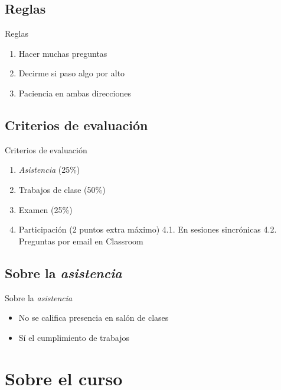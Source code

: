 \documentclass[
  11pt,
  ignorenonframetext,
]{beamer}
\providecommand{\tightlist}{%
  \setlength{\itemsep}{0pt}\setlength{\parskip}{0pt}}
\begin{document}
\hypertarget{reglas}{%
\subsection{Reglas}\label{reglas}}

\begin{frame}{Reglas}
\begin{enumerate}
\item
  Hacer muchas preguntas
\item
  Decirme si paso algo por alto
\item
  Paciencia en ambas direcciones
\end{enumerate}
\end{frame}

\hypertarget{criterios-de-evaluaciuxf3n}{%
\subsection{Criterios de evaluación}\label{criterios-de-evaluaciuxf3n}}

\begin{frame}{Criterios de evaluación}
\begin{enumerate}
\tightlist
\item
  \emph{Asistencia} (25\%)
\item
  Trabajos de clase (50\%)
\item
  Examen (25\%)
\item
  Participación (2 puntos extra máximo) 4.1. En sesiones sincrónicas
  4.2. Preguntas por email en Classroom
\end{enumerate}
\end{frame}

\hypertarget{sobre-la-asistencia}{%
\subsection{\texorpdfstring{Sobre la
\emph{asistencia}}{Sobre la asistencia}}\label{sobre-la-asistencia}}

\begin{frame}{Sobre la \emph{asistencia}}
\begin{itemize}
\tightlist
\item
  No se califica presencia en salón de clases
\item
  Sí el cumplimiento de trabajos
\end{itemize}
\end{frame}

\hypertarget{sobre-el-curso}{%
\section{Sobre el curso}\label{sobre-el-curso}}
\end{document}
